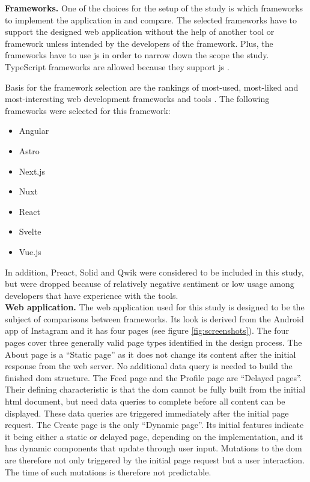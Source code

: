 \documentclass[a4paper, 12pt]{article}
\begin{document}
\textbf{Frameworks.} One of the choices for the setup of the study is which frameworks to implement the application in and compare.
The selected frameworks have to support the designed web application without the help of another tool or framework unless intended by the developers of the framework.
Plus, the frameworks have to use \acrfull{js}  in order to narrow down the scope the study.
TypeScript frameworks are allowed because they support \acrshort{js} \citep{typescript}.

Basis for the framework selection are the rankings of most-used, most-liked and most-interesting web development frameworks and tools \citep{stateOfJs2023}.
The following frameworks were selected for this framework:

\begin{multicols}{4}
\begin{itemize}
  \item Angular
  \item Astro
  \item Next.js
  \item Nuxt
  \item React
  \item Svelte
  \item Vue.js
\end{itemize}
\end{multicols}

In addition, Preact, Solid and Qwik were considered to be included in this study, but were dropped because of relatively negative sentiment or low usage among developers that have experience with the tools.
\\

\textbf{Web application.} The web application used for this study is designed to be the subject of comparisons between frameworks.
Its look is derived from the Android app of Instagram \citep{instagram} and it has four pages (see figure \ref{fig:screenshots}).
The four pages cover three generally valid page types identified in the design process.
The About page is a \enquote{Static page} as it does not change its content after the initial response from the web server.
No additional data query is needed to build the finished \acrshort{dom} structure.
The Feed page and the Profile page are \enquote{Delayed pages}.
Their defining characteristic is that the \acrshort{dom} cannot be fully built from the initial \acrshort{html} document, but need data queries to complete before all content can be displayed.
These data queries are triggered immediately after the initial page request.
The Create page is the only \enquote{Dynamic page}.
Its initial features indicate it being either a static or delayed page, depending on the implementation, and it has dynamic components that update through user input.
Mutations to the \acrshort{dom} are therefore not only triggered by the initial page request but a user interaction.
The time of such mutations is therefore not predictable.
\end{document}
